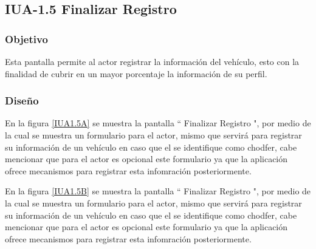 \subsection{IUA-1.5 Finalizar Registro}

\subsubsection{Objetivo}

	
 Esta pantalla permite al actor registrar la información del vehículo, esto con la finalidad de cubrir en un mayor porcentaje la información de su perfil.

\subsubsection{Diseño}


    En la figura \ref{IUA1.5A} se muestra la pantalla `` Finalizar Registro ", por medio de la cual se muestra un formulario para el actor, mismo que servirá para registrar su información de un vehículo en caso que el se identifique como chodfer, cabe mencionar que para el actor es opcional este formulario ya que la aplicación ofrece mecanismos para registrar esta infomración posteriormente.

    En la figura \ref{IUA1.5B} se muestra la pantalla `` Finalizar Registro ", por medio de la cual se muestra un formulario para el actor, mismo que servirá para registrar su información de un vehículo en caso que el se identifique como chodfer, cabe mencionar que para el actor es opcional este formulario ya que la aplicación ofrece mecanismos para registrar esta infomración posteriormente.
    

